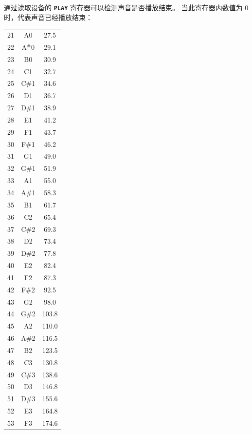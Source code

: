 \documentclass[10pt]{book}
\newcommand{\mach}[1]{\texttt{\textbf{#1}}}
\begin{document}
\begin{CJK}{UTF8}{gkai}
通过读取设备的 \mach{PLAY} 寄存器可以检测声音是否播放结束。
当此寄存器内数值为 $0$ 时，代表声音已经播放结束：

\footnotesize
\twocolumn
\begin{spacing}{0.99}
\begin{supertabular}{ccc}
\label{MIDI}
21  & A0  &  27.5 \\
22  & A$^\#$0 &  29.1 \\
23  & B0  &  30.9 \\
24  & C1  &  32.7 \\
25  & C\#1 &  34.6 \\
26  & D1  &  36.7 \\
27  & D\#1 &  38.9 \\
28  & E1  &  41.2 \\
29  & F1  &  43.7 \\
30  & F\#1 &  46.2 \\
31  & G1  &  49.0 \\
32  & G\#1 &  51.9  \\
33  & A1  &  55.0  \\
34  & A\#1 &  58.3  \\
35  & B1  &  61.7  \\
36  & C2  &  65.4  \\
37  & C\#2 &  69.3  \\
38  & D2  &  73.4  \\
39  & D\#2 &  77.8  \\
40  & E2  &  82.4  \\
41  & F2  &  87.3  \\
42  & F\#2 &  92.5  \\
43  & G2  &  98.0  \\
44  & G\#2 & 103.8  \\
45  & A2  & 110.0  \\
46  & A\#2 & 116.5  \\
47  & B2  & 123.5  \\
48  & C3  & 130.8  \\
49  & C\#3 & 138.6  \\
50  & D3  & 146.8  \\
51  & D\#3 & 155.6  \\
52  & E3  & 164.8  \\
53  & F3  & 174.6  \\

\end{supertabular}
\end{spacing}
\end{CJK}
\end{document}
